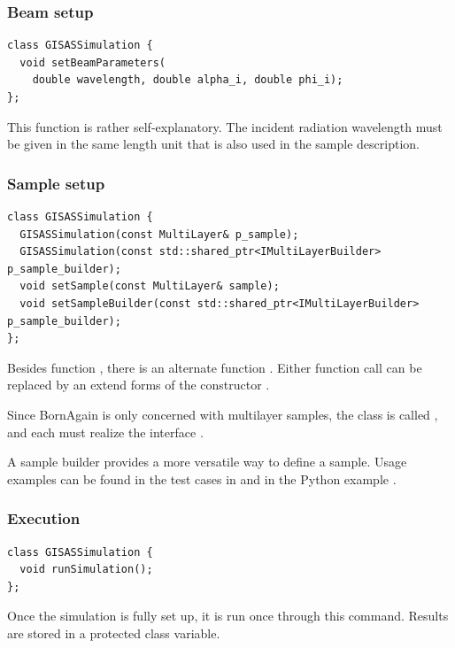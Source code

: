 \subsubsection{Beam setup}\label{SRefBeam}
\begin{lstlisting}
class GISASSimulation {
  void setBeamParameters(
    double wavelength, double alpha_i, double phi_i);
};
\end{lstlisting}
This function
is rather self-explanatory.
The incident radiation wavelength must be given in the same length unit
that is also used in the sample description.

\subsubsection{Sample setup}
\begin{lstlisting}
class GISASSimulation {
  GISASSimulation(const MultiLayer& p_sample);
  GISASSimulation(const std::shared_ptr<IMultiLayerBuilder> p_sample_builder);
  void setSample(const MultiLayer& sample);
  void setSampleBuilder(const std::shared_ptr<IMultiLayerBuilder> p_sample_builder);
};
\end{lstlisting}
Besides function , there is an alternate
function .
Either function call can be replaced by an extend forms of the constructor
.

Since BornAgain is only concerned with multilayer samples,
the  class
%
is called ,
and each  must realize the interface .
%

A sample builder provides a more versatile way to define a sample.
Usage examples can be found in the test cases in 
and in the Python example .

\subsubsection{Execution}
\begin{lstlisting}
class GISASSimulation {
  void runSimulation();
};
\end{lstlisting}
%
Once the simulation is fully set up, it is run once through this command.
Results are stored in a protected class variable.

